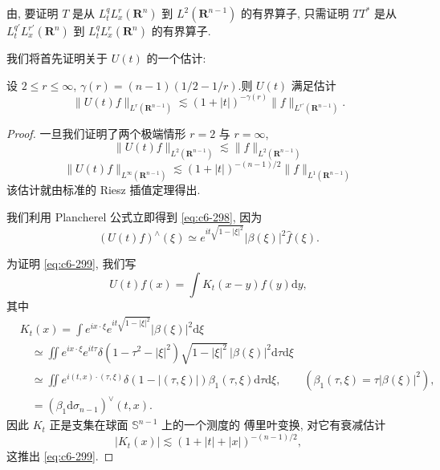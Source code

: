 由, 要证明 $T$ 是从 $L^q_t L^r_x(\mathbf{R}^n)$ 到 $L^2(\mathbf{R}^{n-1})$ 的有界算子, 只需证明 $TT^*$ 是从 $L^{q'}_t L^{r'}_x(\mathbf{R}^n)$ 到 $L^q_t L^r_x(\mathbf{R}^n)$ 的有界算子.

我们将首先证明关于 $U(t)$ 的一个估计:

\begin{proposition}\label{prop:c6-8.20}
设 $2 \leq r \leq \infty$, $\gamma(r) = (n-1)(1/2 - 1/r)$.则 $U(t)$ 满足估计
\begin{equation}
\|U(t) f\|_{L^r(\mathbf{R}^{n-1})} \lesssim (1 + |t|)^{-\gamma(r)} \|f\|_{L^{r'}(\mathbf{R}^{n-1})}.\label{eq:c6-297}
\end{equation}
\end{proposition}

\begin{proof}
一旦我们证明了两个极端情形 $r = 2$ 与 $r = \infty$,
\begin{equation}
\|U(t) f\|_{L^2(\mathbf{R}^{n-1})} \lesssim \|f\|_{L^2(\mathbf{R}^{n-1})}\label{eq:c6-298}
\end{equation}
\begin{equation}
\|U(t) f\|_{L^\infty(\mathbf{R}^{n-1})} \lesssim (1 + |t|)^{-(n-1)/2} \|f\|_{L^1(\mathbf{R}^{n-1})}\label{eq:c6-299}
\end{equation}
该估计就由标准的 Riesz 插值定理得出.

我们利用 Plancherel 公式立即得到 \eqref{eq:c6-298}, 因为
\[
(U(t) f)^\wedge (\xi) \simeq e^{it\sqrt{1 - |\xi|^2}} |\beta(\xi)|^2 \hat{f}(\xi).
\]

为证明 \eqref{eq:c6-299}, 我们写
\[
U(t) f(x) = \int K_t (x-y) f(y) \mathrm{d}y,
\]
其中
\[
\begin{array}{rl}
& K_t(x) = \int e^{ix \cdot \xi} e^{it\sqrt{1 - |\xi|^2}} |\beta(\xi)|^2 \mathrm{d}\xi \\
& \quad \simeq \iint e^{ix \cdot \xi} e^{it\tau} \delta(1 - \tau^2 - |\xi|^2) \sqrt{1 - |\xi|^2}\, |\beta(\xi)|^2 \mathrm{d}\tau \mathrm{d}\xi \\
& \quad \simeq \iint e^{i(t, x) \cdot (\tau, \xi)} \delta(1 - |(\tau, \xi)|) \beta_1(\tau, \xi) \mathrm{d}\tau \mathrm{d}\xi, \qquad (\beta_1(\tau, \xi) = \tau |\beta(\xi)|^2), \\
& \quad = (\beta_1 \mathrm{d}\sigma_{n-1})^\vee (t, x).
\end{array}
\]
因此 $K_t$ 正是支集在球面 $\mathbb{S}^{n-1}$ 上的一个测度的 傅里叶变换, 对它有衰减估计
\[
|K_t(x)| \lesssim (1 + |t| + |x|)^{-(n-1)/2},
\]
这推出 \eqref{eq:c6-299}.
\end{proof}

